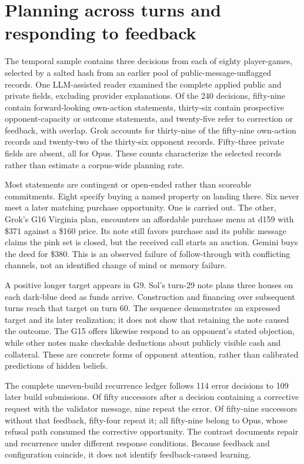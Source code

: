 \section{Planning across turns and responding to feedback}
\label{sec:temporal}

The temporal sample contains three decisions from each of eighty player-games, selected by a salted hash from an earlier pool of public-message-unflagged records. One LLM-assisted reader examined the complete applied public and private fields, excluding provider explanations. Of the 240 decisions, fifty-nine contain forward-looking own-action statements, thirty-six contain prospective opponent-capacity or outcome statements, and twenty-five refer to correction or feedback, with overlap. Grok accounts for thirty-nine of the fifty-nine own-action records and twenty-two of the thirty-six opponent records. Fifty-three private fields are absent, all for Opus. These counts characterize the selected records rather than estimate a corpus-wide planning rate.

Most statements are contingent or open-ended rather than scoreable commitments. Eight specify buying a named property on landing there. Six never meet a later matching purchase opportunity. One is carried out. The other, Grok's G16 Virginia plan, encounters an affordable purchase menu at d159 with \$371 against a \$160 price. Its note still favors purchase and its public message claims the pink set is closed, but the received call starts an auction. Gemini buys the deed for \$380. This is an observed failure of follow-through with conflicting channels, not an identified change of mind or memory failure.

A positive longer target appears in G9. Sol's turn-29 note plans three houses on each dark-blue deed as funds arrive. Construction and financing over subsequent turns reach that target on turn 60. The sequence demonstrates an expressed target and its later realization; it does not show that retaining the note caused the outcome. The G15 offers likewise respond to an opponent's stated objection, while other notes make checkable deductions about publicly visible cash and collateral. These are concrete forms of opponent attention, rather than calibrated predictions of hidden beliefs.

The complete uneven-build recurrence ledger follows 114 error decisions to 109 later build submissions. Of fifty successors after a decision containing a corrective request with the validator message, nine repeat the error. Of fifty-nine successors without that feedback, fifty-four repeat it; all fifty-nine belong to Opus, whose refusal path consumed the corrective opportunity. The contrast documents repair and recurrence under different response conditions. Because feedback and configuration coincide, it does not identify feedback-caused learning.

